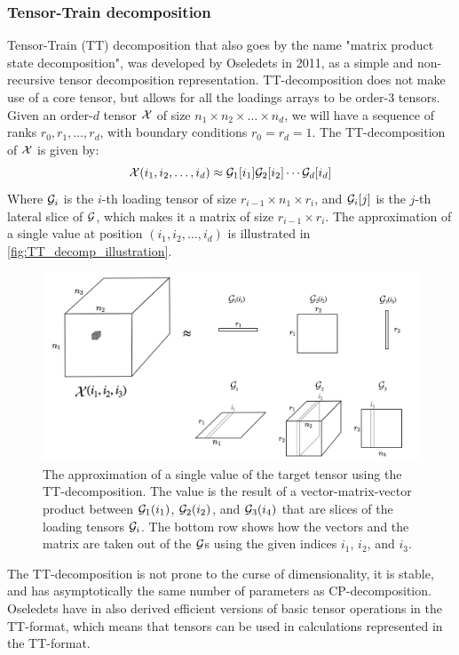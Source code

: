 \subsubsection{Tensor-Train decomposition}
Tensor-Train (TT) decomposition that also goes by the name "matrix product state decomposition", was developed by Oseledets in 2011, as a simple and non-recursive tensor decomposition representation.\cite{Oseledets2011} TT-decomposition does not make use of a core tensor, but allows for all the loadings arrays to be order-3 tensors. Given an order-$d$ tensor $\mathcal{X}$ of size $n_1\times n_2 \times \dots \times n_d$, we will have a sequence of ranks $r_0, r_1, \dots, r_d$, with boundary conditions $r_0=r_d=1$. The TT-decomposition of $\mathcal{X}$ is given by:
\begin{equation}
    \mathcal{X}(i_1, i_2, \dots, i_d) \approx \mathcal{G}_1[i_1] \mathcal{G}_2[i_2] \cdots \mathcal{G}_d[i_d]
\end{equation}
Where $\mathcal{G}_i$ is the $i$-th loading tensor of size $r_{i-1}\times n_1\times r_i$, and $\mathcal{G}_i[j]$ is the $j$-th lateral slice of $\mathcal{G}$, which makes it a matrix of size $r_{i-1}\times r_i$. The approximation of a single value at position $(i_1, i_2, \dots, i_d)$ is illustrated in \autoref{fig:TT_decomp_illustration}.
\begin{figure}
    \centering
    \captionsetup{width=.95\linewidth}
    \includegraphics[width=.9\linewidth]{Pics/02_Theory/TT_decomp_illustration.png}
    \caption{The approximation of a single value of the target tensor using the TT-decomposition. The value is the result of a vector-matrix-vector product between $\mathcal{G}_1(i_1)$, $\mathcal{G}_2(i_2)$, and $\mathcal{G}_3(i_4)$ that are slices of the loading tensors $\mathcal{G}_i$. The bottom row shows how the vectors and the matrix are taken out of the $\mathcal{G}$s using the given indices $i_1$, $i_2$, and $i_3$.}
    \label{fig:TT_decomp_illustration}
\end{figure}

The TT-decomposition is not prone to the curse of dimensionality, it is stable, and has asymptotically the same number of parameters as CP-decomposition. Oseledets have in \cite{Oseledets2011} also derived efficient versions of basic tensor operations in the TT-format, which means that tensors can be used in calculations represented in the TT-format.